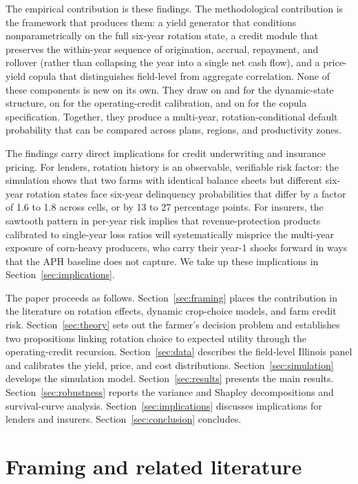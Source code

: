 \documentclass[11pt,letterpaper]{article}
\theoremstyle{remark}
\begin{document}
The empirical contribution is these findings. The methodological contribution is the framework that produces them: a yield generator that conditions nonparametrically on the full six-year rotation state, a credit module that preserves the within-year sequence of origination, accrual, repayment, and rollover (rather than collapsing the year into a single net cash flow), and a price-yield copula that distinguishes field-level from aggregate correlation. None of these components is new on its own. They draw on \citet{Burt1963} and \citet{Livingston2015} for the dynamic-state structure, on \citet{Featherstone2006, Ifft2015} for the operating-credit calibration, and on \citet{Ramsey2019} for the copula specification. Together, they produce a multi-year, rotation-conditional default probability that can be compared across plans, regions, and productivity zones.
 
The findings carry direct implications for credit underwriting and insurance pricing. For lenders, rotation history is an observable, verifiable risk factor: the simulation shows that two farms with identical balance sheets but different six-year rotation states face six-year delinquency probabilities that differ by a factor of 1.6 to 1.8 across cells, or by 13 to 27 percentage points. For insurers, the sawtooth pattern in per-year risk implies that revenue-protection products calibrated to single-year loss ratios will systematically misprice the multi-year exposure of corn-heavy producers, who carry their year-1 shocks forward in ways that the APH baseline does not capture. We take up these implications in Section~\ref{sec:implications}.
 
The paper proceeds as follows. Section~\ref{sec:framing} places the contribution in the literature on rotation effects, dynamic crop-choice models, and farm credit risk. Section~\ref{sec:theory} sets out the farmer's decision problem and establishes two propositions linking rotation choice to expected utility through the operating-credit recursion. Section~\ref{sec:data} describes the field-level Illinois panel and calibrates the yield, price, and cost distributions. Section~\ref{sec:simulation} develops the simulation model. Section~\ref{sec:results} presents the main results. Section~\ref{sec:robustness} reports the variance and Shapley decompositions and survival-curve analysis. Section~\ref{sec:implications} discusses implications for lenders and insurers. Section~\ref{sec:conclusion} concludes.
 
\section{\label{sec:framing}Framing and related literature}
 
\end{document}
